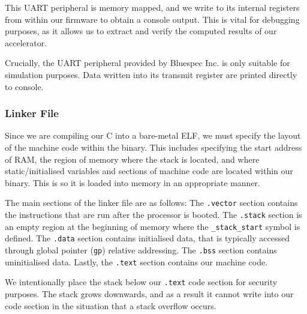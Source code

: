 \documentclass[a4paper,8pt]{report}
\begin{document}
This UART peripheral is memory mapped, and we write to its internal registers
from within our firmware to obtain a console output. This is vital for debugging
purposes, as it allows us to extract and verify the computed results of our
accelerator.

Crucially, the UART peripheral provided by Bluespec Inc. is only suitable for
simulation purposes. Data written into its transmit register are printed
directly to console. 

\subsubsection{Linker File}
Since we are compiling our C into a bare-metal ELF, we must specify the layout
of the machine code within the binary. This includes specifying the start
address of RAM, the region of memory where the stack is located, and where
static/initialised variables and sections of machine code are located within our
binary. This is so it is loaded into memory in an appropriate manner.

The main sections of the linker file are as follows: The \texttt{.vector}
section contains the instructions that are run after the processor is booted.
The \texttt{.stack} section is an empty region at the beginning of memory
where the \texttt{\_stack\_start} symbol is defined. The \texttt{.data} section
contains initialised data, that is typically accessed through global pointer
(\texttt{gp}) relative addressing. The \texttt{.bss} section contains
uninitialised data. Lastly, the \texttt{.text} section contains our machine
code.

We intentionally place the stack below our \texttt{.text} code section for security
purposes. The stack grows downwards, and as a result it cannot write into our
code section in the situation that a stack overflow occurs.
\end{document}

